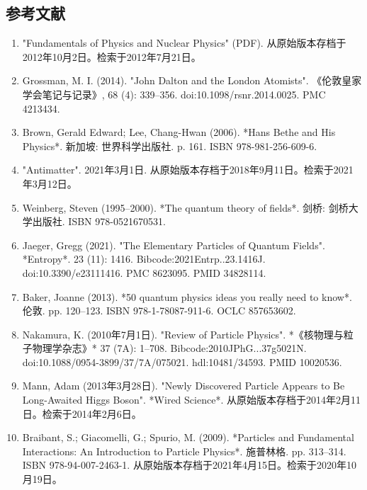 \subsection{参考文献}
\begin{enumerate}
\item "Fundamentals of Physics and Nuclear Physics" (PDF). 从原始版本存档于2012年10月2日。检索于2012年7月21日。
\item Grossman, M. I. (2014). "John Dalton and the London Atomists". 《伦敦皇家学会笔记与记录》, 68 (4): 339–356. doi:10.1098/rsnr.2014.0025. PMC 4213434.
\item Brown, Gerald Edward; Lee, Chang-Hwan (2006). *Hans Bethe and His Physics*. 新加坡: 世界科学出版社. p. 161. ISBN 978-981-256-609-6.
\item "Antimatter". 2021年3月1日. 从原始版本存档于2018年9月11日。检索于2021年3月12日。
\item Weinberg, Steven (1995–2000). *The quantum theory of fields*. 剑桥: 剑桥大学出版社. ISBN 978-0521670531.
\item Jaeger, Gregg (2021). "The Elementary Particles of Quantum Fields". *Entropy*. 23 (11): 1416. Bibcode:2021Entrp..23.1416J. doi:10.3390/e23111416. PMC 8623095. PMID 34828114.
\item Baker, Joanne (2013). *50 quantum physics ideas you really need to know*. 伦敦. pp. 120–123. ISBN 978-1-78087-911-6. OCLC 857653602.
\item Nakamura, K. (2010年7月1日). "Review of Particle Physics". *《核物理与粒子物理学杂志》* 37 (7A): 1–708. Bibcode:2010JPhG...37g5021N. doi:10.1088/0954-3899/37/7A/075021. hdl:10481/34593. PMID 10020536.
\item Mann, Adam (2013年3月28日). "Newly Discovered Particle Appears to Be Long-Awaited Higgs Boson". *Wired Science*. 从原始版本存档于2014年2月11日。检索于2014年2月6日。
\item Braibant, S.; Giacomelli, G.; Spurio, M. (2009). *Particles and Fundamental Interactions: An Introduction to Particle Physics*. 施普林格. pp. 313–314. ISBN 978-94-007-2463-1. 从原始版本存档于2021年4月15日。检索于2020年10月19日。
\end{enumerate}